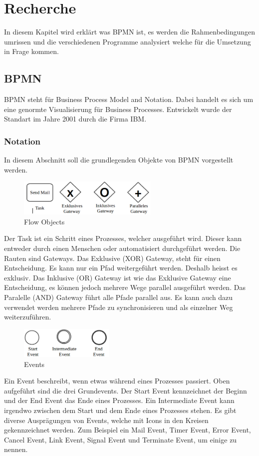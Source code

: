 \chapter{Recherche}

In diesem Kapitel wird erklärt was BPMN ist, es werden die Rahmenbedingungen umrissen und die verschiedenen Programme analysiert welche für die Umsetzung in Frage kommen.

\section{BPMN}
BPMN steht für Business Process Model and Notation. Dabei handelt es sich um eine genormte Visualisierung für Business Processes. Entwickelt wurde der Standart im Jahre 2001 durch die Firma IBM.

\subsection{Notation}
In diesem Abschnitt soll die grundlegenden Objekte von BPMN vorgestellt werden.

\begin{figure}[H]
	\centering
	\includegraphics[width=0.6\textwidth]{images/bpmn-flow-objects.png}
	\caption{Flow Objects}
	\label{fig:recherche:bpmn:flowobjects}
\end{figure}
Der Task ist ein Schritt eines Prozesses, welcher ausgeführt wird. Dieser kann entweder durch einen Menschen oder automatisiert durchgeführt werden. Die Rauten sind Gateways. Das Exklusive (XOR) Gateway, steht für einen Entscheidung. Es kann nur ein Pfad weitergeführt werden. Deshalb heisst es exklusiv. Das Inklusive (OR) Gateway ist wie das Exklusive Gateway eine Entscheidung, es können jedoch mehrere Wege parallel ausgeführt werden. Das Paralelle (AND) Gateway führt alle Pfade parallel aus. Es kann auch dazu verwendet werden mehrere Pfade zu synchronisieren und als einzelner Weg weiterzuführen.

\begin{figure}[H]
	\centering
	\includegraphics[width=0.4\textwidth]{images/bpmn-flow-objects2.png}
	\caption{Events}
	\label{fig:recherche:bpmn:events}
\end{figure}
Ein Event beschreibt, wenn etwas während eines Prozesses passiert. Oben aufgeführt sind die drei Grundevents. Der Start Event kennzeichnet der Beginn und der End Event das Ende eines Prozesses. Ein Intermediate Event kann irgendwo zwischen dem Start und dem Ende eines Prozesses stehen. Es gibt diverse Ausprägungen von Events, welche mit Icons in den Kreisen gekennzeichnet werden. Zum Beispiel ein Mail Event, Timer Event, Error Event, Cancel Event, Link Event, Signal Event und Terminate Event, um einige zu nennen.

